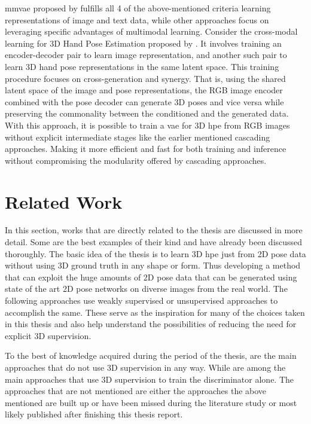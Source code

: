 \ac{mmvae} proposed by \cite{MMVAE} fulfills all 4 of the above-mentioned criteria learning representations of image and text data, while other approaches focus on leveraging specific advantages of multimodal learning. Consider the cross-modal learning for 3D Hand Pose Estimation proposed by \cite{crossmodal}. It involves training an encoder-decoder pair to learn image representation, and another such pair to learn 3D hand pose representations in the same latent space. This training procedure focuses on cross-generation and synergy. That is, using the shared latent space of the image and pose representations, the RGB image encoder combined with the pose decoder can generate 3D poses and vice versa while preserving the commonality between the conditioned and the generated data. With this approach, it is possible to train a \ac{vae} for 3D \ac{hpe} from RGB images without explicit intermediate stages like the earlier mentioned cascading approaches. Making it more efficient and fast for both training and inference without compromising the modularity offered by cascading approaches.

\section{Related Work}
\label{sec:Related Work}

In this section, works that are directly related to the thesis are discussed in more detail. Some are the best examples of their kind and have already been discussed thoroughly. The basic idea of the thesis is to learn 3D \ac{hpe} just from 2D pose data without using 3D ground truth in any shape or form. Thus developing a method that can exploit the huge amounts of 2D pose data that can be generated using state of the art 2D pose networks on diverse images from the real world. The following approaches use weakly supervised or unsupervised approaches to accomplish the same. These serve as the inspiration for many of the choices taken in this thesis and also help understand the possibilities of reducing the need for explicit 3D supervision.

To the best of knowledge acquired during the period of the thesis, \cite{can3dpose, amazon1, unsupervisedAdversarial, c3dpo} are the main approaches that do not use 3D supervision in any way. While \cite{repnet, weaklymultiple} are among the main approaches that use 3D supervision to train the discriminator alone. The approaches that are not mentioned are either the approaches the above mentioned are built up or have been missed during the literature study or most likely published after finishing this thesis report.

